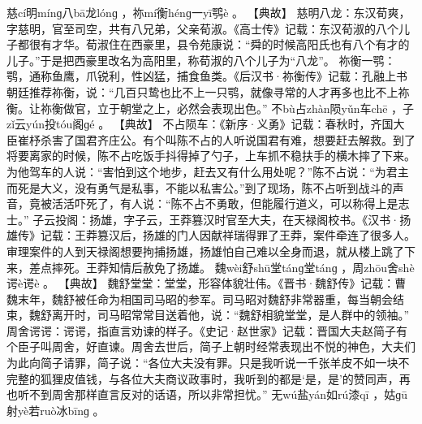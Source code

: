 \documentclass[12pt,UTF8]{ctexbook}
\begin{document}
慈cí明mínɡ八bā龙lónɡ
，祢mí衡hénɡ一yī鹗è
。
【典故】
慈明八龙：东汉荀爽，字慈明，官至司空，共有八兄弟，父亲荀淑。《高士传》记载：东汉荀淑的八个儿子都很有才华。荀淑住在西豪里，县令苑康说：“舜的时候高阳氏也有八个有才的儿子。”于是把西豪里改名为高阳里，称荀淑的八个儿子为“八龙”。
祢衡一鹗：鹗，通称鱼鹰，爪锐利，性凶猛，捕食鱼类。《后汉书·祢衡传》记载：孔融上书朝廷推荐祢衡，说：“几百只鸷也比不上一只鹗，就像寻常的人才再多也比不上祢衡。让祢衡做官，立于朝堂之上，必然会表现出色。”
不bù占zhàn陨yǔn车chē
，子zǐ云yún投tóu阁ɡé
。
【典故】
不占陨车：《新序·义勇》记载：春秋时，齐国大臣崔杼杀害了国君齐庄公。有个叫陈不占的人听说国君有难，想要赶去解救。到了将要离家的时候，陈不占吃饭手抖得掉了勺子，上车抓不稳扶手的横木摔了下来。为他驾车的人说：“害怕到这个地步，赶去又有什么用处呢？”陈不占说：“为君主而死是大义，没有勇气是私事，不能以私害公。”到了现场，陈不占听到战斗的声音，竟被活活吓死了，有人说：“陈不占不勇敢，但能履行道义，可以称得上是志士。”
子云投阁：扬雄，字子云，王莽篡汉时官至大夫，在天禄阁校书。《汉书·扬雄传》记载：王莽篡汉后，扬雄的门人因献祥瑞得罪了王莽，案件牵连了很多人。审理案件的人到天禄阁想要拘捕扬雄，扬雄怕自己难以全身而退，就从楼上跳了下来，差点摔死。王莽知情后赦免了扬雄。
魏wèi舒shū堂tánɡ堂tánɡ
，周zhōu舍shè谔è谔è
。
【典故】
魏舒堂堂：堂堂，形容体貌壮伟。《晋书·魏舒传》记载：曹魏末年，魏舒被任命为相国司马昭的参军。司马昭对魏舒非常器重，每当朝会结束，魏舒离开时，司马昭常常目送着他，说：“魏舒相貌堂堂，是人群中的领袖。”
周舍谔谔：谔谔，指直言劝谏的样子。《史记·赵世家》记载：晋国大夫赵简子有个臣子叫周舍，好直谏。周舍去世后，简子上朝时经常表现出不悦的神色，大夫们为此向简子请罪，简子说：“各位大夫没有罪。只是我听说一千张羊皮不如一块不完整的狐狸皮值钱，与各位大夫商议政事时，我听到的都是‘是，是’的赞同声，再也听不到周舍那样直言反对的话语，所以非常担忧。”
无wú盐yán如rú漆qī
，姑ɡū射yè若ruò冰bīnɡ
。
\end{document}
